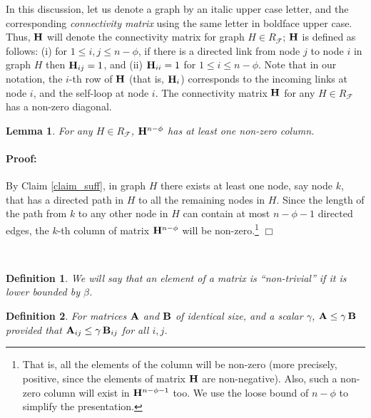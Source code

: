 \documentclass[letterpaper, 12pt]{article}
\newenvironment{proof}{\paragraph{\bf Proof:}}{\hspace*{\fill}\(\Box\)}
\newcommand{\scriptf}{\mathcal{F}}
\newtheorem{definition}{Definition}
\newtheorem{lemma}{Lemma}
\begin{document}
In this discussion, let us denote a graph by an italic upper case letter,
and the corresponding {\em connectivity matrix} using the same letter
in boldface upper case. Thus,
${\bf H}$ will denote the connectivity matrix for graph $H\in R_\scriptf$;
${\bf H}$ is defined as follows:
(i) for $1\leq i,j\leq n-\phi$,
if there is a directed link from node $j$ to node $i$ in
graph $H$ then ${\bf H}_{ij}=1$,
and (ii) ${\bf H}_{ii}=1$ for $1\leq i\leq n-\phi$.
Note that in our notation, the $i$-th row of ${\bf H}$ (that is, ${\bf H}_i$)
corresponds to the incoming links at node $i$, and the self-loop
at node $i$.
The connectivity matrix ${\bf H}$ for any $H\in R_\scriptf$
has a non-zero diagonal.


\begin{lemma}
\label{l_one_column}
For any $H\in R_\scriptf$, ${\bf H}^{n-\phi}$ has at least one non-zero column.
\end{lemma}
\begin{proof}
By Claim \ref{claim_suff}, in graph $H$ there exists at least one node, say
node $k$, that has a directed path in $H$ to all the remaining nodes in $H$.
Since the length of the path from $k$ to any other node in $H$ can contain
at most $n-\phi-1$ directed edges,
the $k$-th column of matrix ${{\bf H}^{n-\phi}}$ will
be non-zero.\footnote{That is, all the elements of the column will be
non-zero (more precisely, positive, since the elements of matrix ${\bf H}$
are non-negative).
Also, such a non-zero column will exist in ${\bf H}^{n-\phi-1}$ too.
We use the loose bound of $n-\phi$ to simplify the presentation. }
\end{proof}

~


\begin{definition}
We will say that an element of a matrix is ``non-trivial'' if it is lower
bounded by $\beta$.
\end{definition}

\begin{definition}
For matrices ${\bf A}$ and ${\bf B}$ of identical size, and
a scalar $\gamma$, ${\bf A}\leq \gamma \, {\bf B}$ provided
that ${\bf A}_{ij}\leq \gamma\, {\bf B}_{ij}$ for all $i,j$.
\end{definition}
\end{document}
